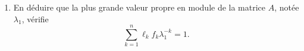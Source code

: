 \begin{enumerate}
{$$\begin{array}{cccccc}
            f_1-\lambda & f_2 & \cdots  & \cdots & f_n \\
            s_1 & -\lambda & 0  & \cdots & 0 \\
            0 & s_2 & \ddots & \ddots & \vdots \\
            \vdots & \vdots & \ddots & \ddots & 0 \\
            0 & \cdots & 0 & s_{n-1} & -\lambda \\
          \end{array}\right|
  $$ 
  par rapport à la première ligne sont
  \begin{align*}
  (f_1 - \lambda) |B_1| & = (f_1-\lambda) (-\lambda^{n-1}), &
  - f_2 |B_2| & = -f_2 s_1 (-\lambda)^{n-2}, \\
  f_3 |B_3| & = f_3 s_1 s_2 (-\lambda)^{n-3}, & 
  -f_4 |B_4| & = -f_4 s_1 s_2 s_3 (-\lambda)^{n-4}, \qquad \dots
  \end{align*}}
  \item En déduire que la plus grande valeur propre en module de la matrice $A$, notée $\lambda_1$, vérifie
  $$
  \sum_{k=1}^n \ell_k f_k \lambda_1^{-k} = 1.
  $$
\end{enumerate}

